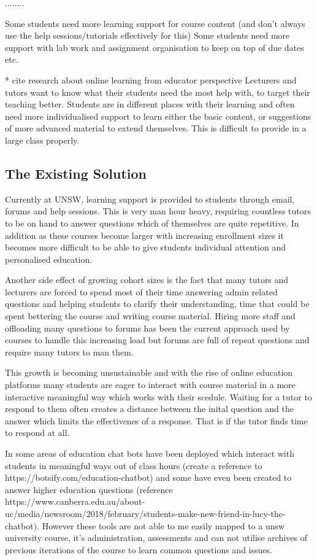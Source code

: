 \documentclass{article}
\begin{document}
........ 

Some students need more learning support for course content (and don't always use the help sessions/tutorials effectively for this)
Some students need more support with lab work and assignment organisation to keep on top of due dates etc. 

* cite research about online learning from educator perspective
Lecturers and tutors want to know what their students need the most help with, to target their teaching better. Students are in different 
places with their learning and often need more individualised support to learn either the basic content, or suggestions of more advanced 
material to extend themselves. This is difficult to provide in a large class properly.


\subsection{The Existing Solution}

Currently at UNSW, learning support is provided to students through email, forums and help sessions. This is very man hour heavy, requiring countless tutors to be on hand to answer questions which of themselves are quite repetitive. In addition as these courses become larger with increasing enrollment sizes it becomes more difficult to be able to give students individual attention and personalised education. 

Another side effect of growing cohort sizes is the fact that many tutors and lecturers are forced to spend most of their time answering admin related questions and helping students to clarify their understanding, time that could be spent bettering the course and writing course material. Hiring more staff and offloading many questions to forums has been the current approach used by courses to handle this increasing load but forums are full of repeat questions and require many tutors to man them. 

This growth is becoming unsustainable and with the rise of online education platforms many students are eager to interact with course material in a more interactive meaningful way which works with their scedule. Waiting for a tutor to respond to them often creates a distance between the inital question and the answer which limits the effectivenes of a response. That is if the tutor finds time to respond at all. 

In some areas of education chat bots have been deployed which interact with students in meaningful ways out of class hours (create a reference to https://botsify.com/education-chatbot) and some have even been created to answer higher education questions (reference https://www.canberra.edu.au/about-uc/media/newsroom/2018/february/students-make-new-friend-in-lucy-the-chatbot). However these tools are not able to me easily mapped to a unsw university course, it's administration, assessments and can not utilise archives of previous iterations of the course to learn common questions and issues.
\end{document}
